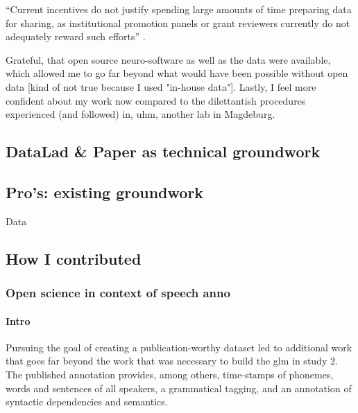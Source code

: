 ``Current incentives do not justify spending large amounts of time preparing
data for sharing, as institutional promotion panels or grant reviewers currently
do not adequately reward such efforts'' \citep{nichols2017best}.

Grateful, that open source neuro-software as well as the data were available,
which allowed me to go far beyond what would have been possible without open
data [kind of not true because I used "in-house data"].
%
Lastly, I feel more confident about my work now compared to the dilettantish
procedures experienced (and followed) in, uhm, another lab in Magdeburg.



\subsection{DataLad \& Paper as technical groundwork}

\subsection{Pro's: existing groundwork}

Data

\subsection{How I contributed}



\subsubsection{Open science in context of speech anno}



\paragraph{Intro}

Pursuing the goal of creating a publication-worthy dataset led to additional
work that goes far beyond the work that was necessary to build the \ac{glm} in
study 2.
The published annotation provides, among others, time-stamps of phonemes, words
and sentences of all speakers, a grammatical tagging, and an annotation of
syntactic dependencies and semantics.


